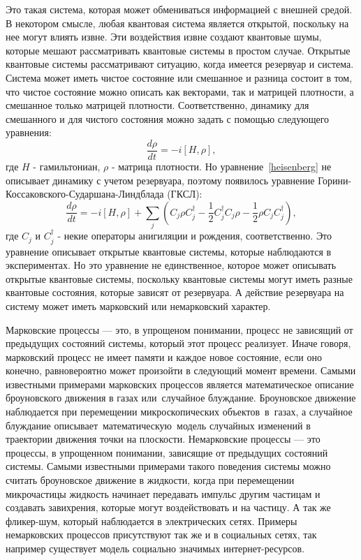 Это такая система, которая может обмениваться информацией с внешней средой.
В некотором смысле, любая квантовая система является открытой, поскольку на нее могут влиять извне.
Эти воздействия извне создают квантовые шумы, которые мешают рассматривать квантовые системы в простом случае.
Открытые квантовые системы рассматривают ситуацию, когда имеется резервуар и система.
Система может иметь чистое состояние или смешанное и разница состоит в том, что чистое состояние можно
описать как векторами, так и матрицей плотности, а смешанное только матрицей плотности.
Соответственно, динамику для смешанного и для чистого состояния можно задать с помощью следующего уравнения:
\begin{equation}\label{heisenberg}
    \frac{d \rho}{dt} = -i[H,\rho],
\end{equation}
где $H$ - гамильтониан, $\rho$ - матрица плотности.
Но уравнение~\eqref{heisenberg} не описывает динамику с учетом резервуара, поэтому появилось уравнение
Горини-Коссаковского-Сударшана-Линдблада (ГКСЛ):
\begin{equation}
    \frac{d \rho}{dt} = -i[H,\rho] +
    \sum_{j} (C_{j}\rho C^{\dagger}_{j} - \frac{1}{2} C^{\dagger}_{j} C_{j} \rho - \frac{1}{2} \rho C_{j} C^{\dagger}_{j}),
\end{equation}
где $C_{j}$ и $C^{\dagger}_{j}$ - некие операторы анигиляции и рождения, соответственно.
Это уравнение описывает открытые квантовые системы, которые наблюдаются в экспериментах.
Но это уравнение не единственное, которое может описывать открытые квантовые системы, поскольку
квантовые системы могут иметь разные квантовые состояния, которые зависят от резервуара.
А действие резервуара на систему может иметь марковский или немарковский характер.

Марковские процессы — это, в упрощеном понимании, процесс не зависящий от предыдущих состояний системы,
который этот процесс реализует.
Иначе говоря, марковский процесс не имеет памяти и каждое новое состояние, если оно конечно, равновероятно
может произойти в следующий момент времени.
Самыми известными примерами марковских процессов является математическое описание броуновского движения
в газах или~случайное блуждание.
Броуновское движение наблюдается при перемещении микроскопических объектов~в~газах, а случайное блуждание
описывает~математическую~модель случайных изменений в траектории движения точки на плоскости.
Немарковские процессы — это процессы, в упрощенном понимании, зависящие от предыдущих состояний системы.
Самыми известными примерами такого поведения системы можно считать броуновское движение в жидкости,
когда при перемещении микрочастицы жидкость начинает передавать импульс другим частицам и создавать
завихрения, которые могут воздействовать и на частицу.
А так же фликер-шум, который наблюдается в электрических сетях.
Примеры немарковских процессов присутствуют так же и в социальных сетях, так например существует
модель социально значимых интернет-ресурсов.

